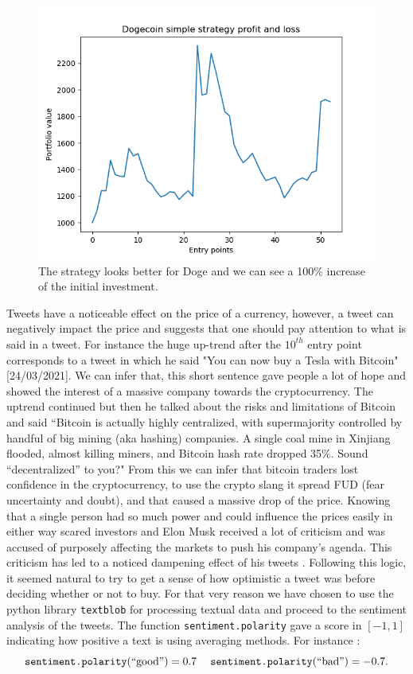 \documentclass[twoside]{report}
\newcommand{\code}{\texttt}
\begin{document}
\begin{spacing}{1}
\begin{figure}[!htbp]
    \centering
    \includegraphics[scale = 0.5]{TestPlots/plot-DOGE-pnl.png}
    \caption{The strategy looks better for Doge and we can see a 100\% increase of the initial investment.}
    \label{}
\end{figure}
Tweets have a noticeable effect on the price of a currency, however, a tweet can negatively impact the price and suggests that one should pay attention to what is said in a tweet. For instance the huge up-trend after the $10^{th}$ entry point corresponds to a tweet in which he said "You can now buy a Tesla with Bitcoin" [24/03/2021]. We can infer that, this short sentence gave people a lot of hope and showed the interest of a massive company towards the cryptocurrency. The uptrend continued but then he talked about the risks and limitations of Bitcoin and said ``Bitcoin is actually highly centralized, with supermajority controlled by handful of big mining (aka hashing) companies. A single coal mine in Xinjiang flooded, almost killing miners, and Bitcoin hash rate dropped 35\%. Sound “decentralized” to you?" %
From this we can infer that bitcoin traders lost confidence in the cryptocurrency, to use the crypto slang it spread FUD (fear uncertainty and doubt), and that caused a massive drop of the price. Knowing that a single person had so much power and could influence the prices easily in either way scared investors and Elon Musk received a lot of criticism and was accused of purposely affecting the markets to push his company's agenda. This criticism has led to a noticed dampening effect of his tweets \cite{ElonCriticism}. Following this logic, it seemed natural to try to get a sense of how optimistic a tweet was before deciding whether or not to buy. For that very reason we have chosen to use the python library \code{textblob} \cite{loria2018textblob} for processing textual data and proceed to the sentiment analysis of the tweets. The function \code{sentiment.polarity} gave a score in $ [-1,1]$ indicating how positive a text is using averaging methods. For instance : \[\code{sentiment.polarity}(``\text{good}")=0.7\;\;\;\:\:\code{sentiment.polarity}(``\text{bad}")=-0.7.\]

\end{spacing}
\end{document}
